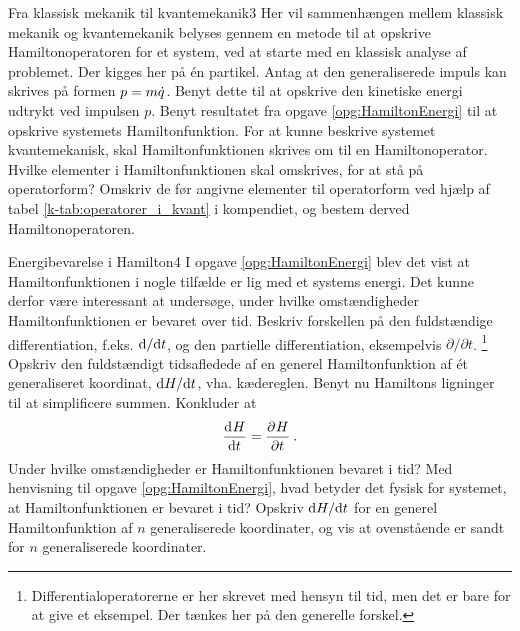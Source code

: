 %
%
\begin{opgave}{Fra klassisk mekanik til kvantemekanik}{3}
Her vil sammenhængen mellem klassisk mekanik og kvantemekanik belyses gennem en metode til at opskrive Hamiltonoperatoren for et system, ved at starte med en klassisk analyse af problemet. Der kigges her på én partikel.
\opg Antag at den generaliserede impuls kan skrives på formen $p = m\dt{q}$. Benyt dette til at opskrive den kinetiske energi udtrykt ved impulsen $p$.
\opg Benyt resultatet fra opgave \ref{opg:HamiltonEnergi} til at opskrive systemets Hamiltonfunktion.
\opg For at kunne beskrive systemet kvantemekanisk, skal Hamiltonfunktionen skrives om til en Hamiltonoperator. Hvilke elementer i Hamiltonfunktionen skal omskrives, for at stå på operatorform?
\opg Omskriv de før angivne elementer til operatorform ved hjælp af tabel \ref{k-tab:operatorer_i_kvant} i kompendiet, og bestem derved Hamiltonoperatoren.
\end{opgave}
%
%
\begin{opgave}{Energibevarelse i Hamilton}{4}
I opgave \ref{opg:HamiltonEnergi} blev det vist at Hamiltonfunktionen i nogle tilfælde er lig med et systems energi. Det kunne derfor være interessant at undersøge, under hvilke omstændigheder Hamiltonfunktionen er bevaret over tid.
\opg Beskriv forskellen på den fuldstændige differentiation, f.eks. $\d/\d t$, og den partielle differentiation, eksempelvis $\partial/\partial t$. \footnote{Differentialoperatorerne er her skrevet med hensyn til tid, men det er bare for at give et eksempel. Der tænkes her på den generelle forskel.} 
\opg Opskriv den fuldstændigt tidsafledede af en generel Hamiltonfunktion af ét generaliseret koordinat, $\d H/\d t$, vha. kædereglen.
\opg Benyt nu Hamiltons ligninger til at simplificere summen.
\opg Konkluder at
\begin{align*}
\dif{t}{H} = \pdif{t}{H} \: .
\end{align*}
\opg Under hvilke omstændigheder er Hamiltonfunktionen bevaret i tid?
\opg Med henvisning til opgave \ref{opg:HamiltonEnergi}, hvad betyder det fysisk for systemet, at Hamiltonfunktionen er bevaret i tid?
\opg Opskriv $\d H/\d t$ for en generel Hamiltonfunktion af $n$ generaliserede koordinater, og vis at ovenstående er sandt for $n$ generaliserede koordinater.
\end{opgave}